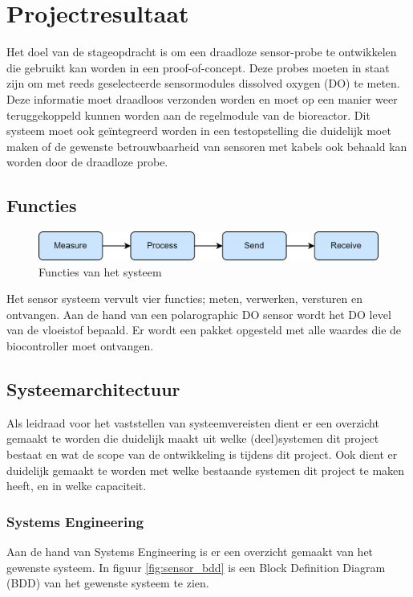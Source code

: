 \section{Projectresultaat}
Het doel van de stageopdracht is om een draadloze sensor-probe te ontwikkelen die gebruikt kan worden in een proof-of-concept. Deze probes moeten in staat zijn om met reeds geselecteerde sensormodules dissolved oxygen (DO) te meten. Deze informatie moet draadloos verzonden worden en moet op een manier weer teruggekoppeld kunnen worden aan de regelmodule van de bioreactor. Dit systeem moet ook geïntegreerd worden in een testopstelling die duidelijk moet maken of de gewenste betrouwbaarheid van sensoren met kabels ook behaald kan worden door de draadloze probe.

\subsection{Functies}
\begin{figure}[H]
	\centering
	\includegraphics[width=0.60\linewidth]{graphics/function}
	\caption{Functies van het systeem}
	\label{fig:function}
\end{figure}
Het sensor systeem vervult vier functies; meten, verwerken, versturen en ontvangen. Aan de hand van een polarographic DO sensor wordt het DO level van de vloeistof bepaald. Er wordt een pakket opgesteld met alle waardes die de biocontroller moet ontvangen. 

\subsection{Systeemarchitectuur}
Als leidraad voor het vaststellen van systeemvereisten dient er een overzicht gemaakt te worden die duidelijk maakt uit welke (deel)systemen dit project bestaat en wat de scope van de ontwikkeling is tijdens dit project. Ook dient er duidelijk gemaakt te worden met welke bestaande systemen dit project te maken heeft, en in welke capaciteit. 

\subsubsection{Systems Engineering}
Aan de hand van Systems Engineering is er een overzicht gemaakt van het gewenste systeem. In figuur \ref{fig:sensor_bdd} is een Block Definition Diagram (BDD) van het gewenste systeem te zien.

